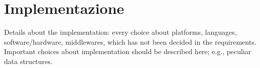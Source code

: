 \chapter{Implementazione}

Details about the implementation: every choice about platforms, languages, software/hardware, middlewares, which has not been decided in the requirements.
Important choices about implementation should be described here; e.g., peculiar data structures.